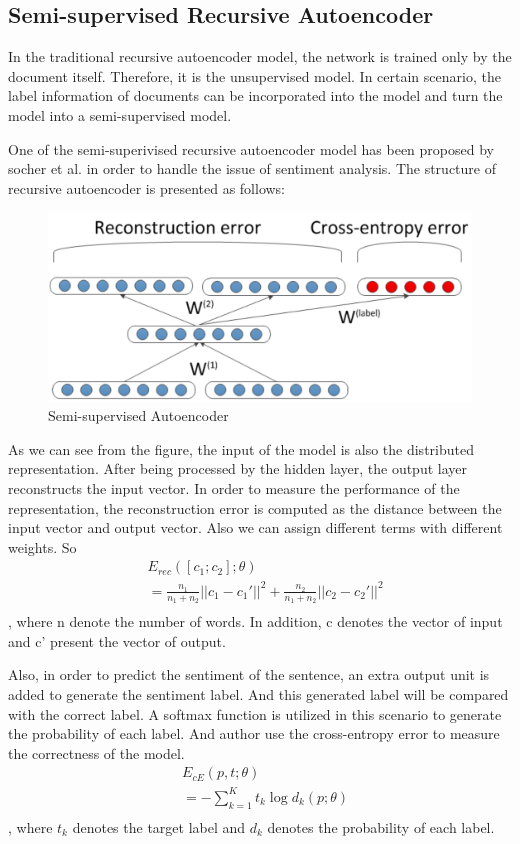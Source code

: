 \documentclass[dvips,9pt]{article}
\begin{document}
\subsection{Semi-supervised Recursive Autoencoder}
In the traditional recursive autoencoder model, the network is trained only by the document itself. Therefore, it is the unsupervised model. In certain scenario, the label information of documents can be incorporated into the model and turn the model into a semi-supervised model.

One of the semi-superivised recursive autoencoder model has been proposed by socher et al.\cite{socher2011semi} in order to handle the issue of sentiment analysis. The structure of recursive autoencoder is presented as follows:
\begin{figure}[ht]
\centering
\includegraphics[width = 0.7\linewidth]{figure/semiautoencoder}
\caption{Semi-supervised Autoencoder}
\label{fig:sae}
\end{figure}	
	
As we can see from the figure, the input of the model is also the distributed representation. After being processed by the hidden layer, the output layer reconstructs the input vector. In order to measure the performance of the representation, the reconstruction error is computed as the distance between the input vector and output vector. Also we can assign different terms with different weights. So
\begin{equation}
\begin{split}
 & E_{rec}([c_{1};c_{2}];\theta) \\
 & = \frac{n_{1}}{n_{1}+n_{2}} ||c_{1}-c_{1}'||^2 + \frac{n_{2}}{n_{1}+n_{2}} ||c_{2}-c_{2}'||^2\\
 \end{split}
\end{equation}
, where n denote the number of words. In addition, c denotes the vector of input and c' present the vector of output.

Also, in order to predict the sentiment of the sentence, an extra output unit is added to generate the sentiment label. And this generated label will be compared with the correct label. A softmax function is utilized in this scenario to generate the probability of each label. And author use the cross-entropy error to measure the correctness of the model.
\begin{equation}
\begin{split}
 & E_{cE}(p,t;\theta) \\
 & = -\sum_{k=1}^{K}{t_{k}\log{}d_{k}(p;\theta)}\\
 \end{split}
\end{equation}
, where $t_{k}$ denotes the target label and $d_{k}$ denotes the probability of each label.
\end{document}
